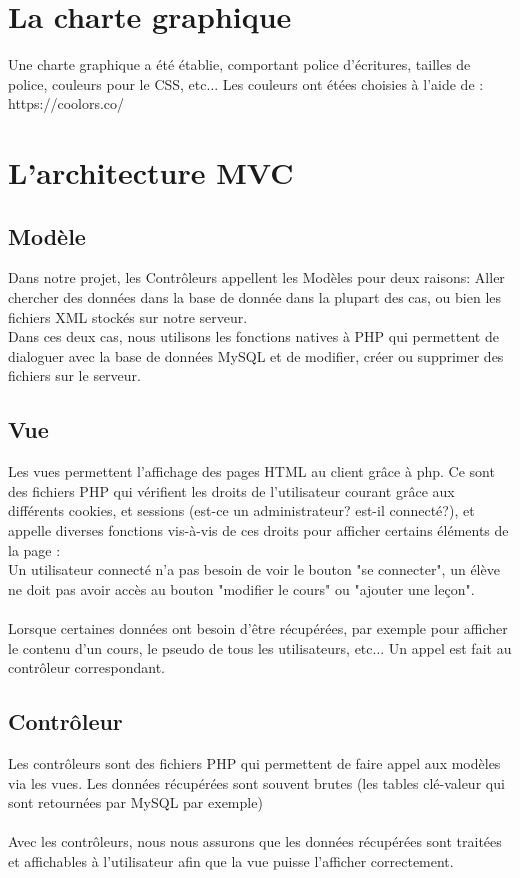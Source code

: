 \documentclass[a4paper,10pt]{article}
\begin{document}
\section{La charte graphique}
Une charte graphique a été établie, comportant police d'écritures, tailles de police, couleurs pour le CSS, etc...
Les couleurs ont étées choisies à l'aide de : https://coolors.co/

\section{L'architecture MVC}
\subsection{Modèle}
Dans notre projet, les Contrôleurs appellent les Modèles pour deux raisons: Aller chercher des données dans la base de donnée dans la plupart des cas, ou bien les fichiers XML stockés sur notre serveur.\\
Dans ces deux cas, nous utilisons les fonctions natives à PHP qui permettent de dialoguer avec la base de données MySQL et de modifier, créer ou supprimer des fichiers sur le serveur.
\subsection{Vue}
Les vues permettent l'affichage des pages HTML au client grâce à php. Ce sont des fichiers PHP qui vérifient les droits de l'utilisateur courant grâce aux différents cookies, et sessions (est-ce un administrateur? est-il connecté?), et appelle diverses fonctions vis-à-vis de ces droits pour afficher certains éléments de la page : \\
Un utilisateur connecté n'a pas besoin de voir le bouton "se connecter", un élève ne doit pas avoir accès au bouton "modifier le cours" ou "ajouter une leçon".\\ \\
Lorsque certaines données ont besoin d'être récupérées, par exemple pour afficher le contenu d'un cours, le pseudo de tous les utilisateurs, etc... Un appel est fait au contrôleur correspondant.
\subsection{Contrôleur}
Les contrôleurs sont des fichiers PHP qui permettent de faire appel aux modèles via les vues. Les données récupérées sont souvent brutes (les tables clé-valeur qui sont retournées par MySQL par exemple)\\\\
Avec les contrôleurs, nous nous assurons que les données récupérées sont traitées et affichables à l'utilisateur afin que la vue puisse l'afficher correctement.
\end{document}
